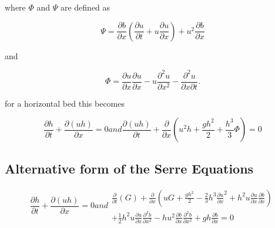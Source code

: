 where $\Phi$ and $\Psi$ are defined as
\begin{defn}
	\label{eqn:FullSerreNonConVarDef}
	\begin{equation*}
	{ \Psi }  = \dfrac{\partial b}{\partial x}\left(\dfrac{\partial u}{\partial t} + u\dfrac{\partial u}{\partial x} \right)  + u^2\dfrac{\partial b}{\partial x}
	\end{equation*}
	
	and
	
	\begin{equation*}
	 { \Phi }  = \dfrac{\partial u }{\partial x} \dfrac{\partial u}{\partial x} -u \dfrac{\partial^2 u}{\partial x^2}  - \dfrac{\partial^2 u}{\partial x \partial t} .
	\end{equation*}

\end{defn}	

for a horizontal bed this becomes

\begin{subequations}
	\label{eqn:FullSerreNonConHorizbed}
	\begin{equation}
	\label{eqn:FullSerreNonConMassHorizbed}
	\frac{\partial h}{\partial t} + \dfrac{\partial (uh)}{\partial x} = 0
	\end{equation}
	
	and
	
	\begin{equation}
	\label{eqn:FullSerreNonConMomeHorizbed}
	\dfrac{\partial (uh)}{\partial t} + \dfrac{\partial}{\partial x} \left ( u^2h + \dfrac{gh^2}{2} + \dfrac{h^3}{3}{ \Phi }  \right ) = 0
	\end{equation}
\end{subequations}	


\subsection{Alternative form of the Serre Equations}


\begin{subequations}
	\label{eqn:FullSerreCon}
	\begin{equation}
	\label{eqn:FullSerreConMass}
	\frac{\partial h}{\partial t} + \dfrac{\partial (uh)}{\partial x} = 0
	\end{equation}
	
	and
	
	\begin{multline}
	\label{eqn:Serreconsconmom}
	\frac{\partial}{\partial t} \left( G \right)  + \frac{\partial}{\partial x} \left( {u} G + \frac{gh^2}{2} - \frac{2}{3}h^3 \frac{\partial {u}}{\partial x}^2 + h^2 {u}\frac{\partial {u}}{\partial x}\frac{\partial b}{\partial x} \right) \\ + \frac{1}{2}h^2 {u} \frac{\partial {u}}{\partial x} \frac{\partial^2 b}{\partial x^2}  - h {u}^2\frac{\partial b}{\partial x}\frac{\partial^2 b}{\partial x^2} + gh\frac{\partial b}{\partial x} = 0
	\end{multline}
	
\end{subequations}

